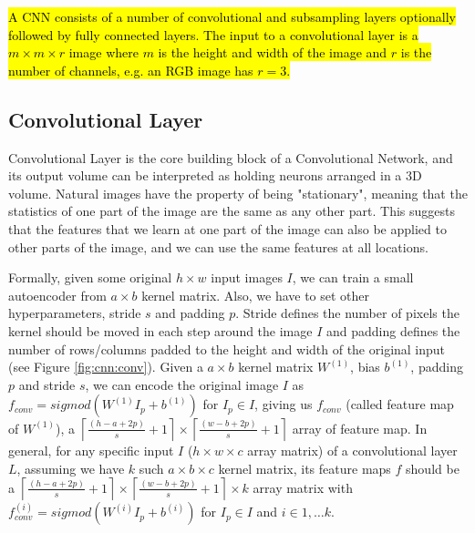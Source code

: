 \hl{A CNN consists of a number of convolutional and subsampling layers optionally followed by fully connected layers. The input to a convolutional layer is a $m \times m \times r$ image where $m$ is the height and width of the image and $r$ is the number of channels, e.g. an RGB image has $r=3$.}
\subsection{Convolutional Layer}
Convolutional Layer is the core building block of a Convolutional Network, and its output volume can be interpreted as holding neurons arranged in a 3D volume.
Natural images have the property of being "stationary", meaning that the statistics of one part of the image are the same as any other part. This suggests that the features that we learn at one part of the image can also be applied to other parts of the image, and we can use the same features at all locations.

Formally, given some original $h\times w$ input images $I$, we can train a small autoencoder from $a \times b$ kernel matrix. Also, we have to set other hyperparameters, stride $s$ and padding $p$. Stride defines the number of pixels the kernel should be moved in each step around the image $I$ and padding defines the number of rows/columns padded to the height and width of the original input (see Figure \ref{fig:cnn:conv}). 
Given a $a \times b$ kernel matrix $W^{(1)}$, bias $b^{(1)}$, padding $p$ and stride $s$, we can encode the original image $I$ as $f_{conv}=sigmod(W^{(1)}I_p+b^{(1)})$ for $I_p \in I$, giving us $f_{conv}$ (called feature map of $W^{(1)}$), a  $\left\lceil\frac{(h-a+2p)}{s}+1\right\rceil\times\left\lceil\frac{(w-b+2p)}{s}+1\right\rceil$ array of feature map. In general, for any specific input $I$ ($h \times w \times c$ array matrix) of a convolutional layer $L$, assuming we have $k$ such $a \times b \times c$ kernel matrix, its feature maps $f$ should be a $\left\lceil\frac{(h-a+2p)}{s}+1\right\rceil\times\left\lceil\frac{(w-b+2p)}{s}+1\right\rceil \times k$ array matrix with $f_{conv}^{(i)}=sigmod(W^{(i)}I_p+b^{(i)})$ for $I_p \in I$ and $i \in 1,\dots k$.

